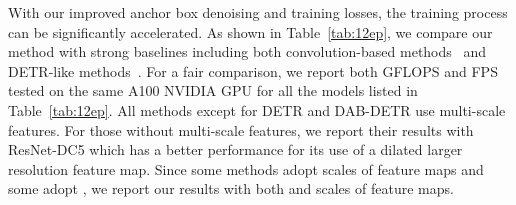 \documentclass[runningheads]{llncs}
\begin{document}
With our improved anchor box denoising and training losses, the training process can be significantly accelerated. As shown in Table~\ref{tab:12ep}, we compare our method with strong baselines including both convolution-based methods~\cite{ren2015faster,chen2019hybrid,dai2021dynamic} and DETR-like methods~\cite{carion2020end,zhu2020deformable,Dai_2021_ICCV,liu2022dab,li2022dn}. For a fair comparison, we report both GFLOPS and FPS tested on the same A100 NVIDIA GPU for all the models listed in Table~\ref{tab:12ep}. All methods except for DETR and DAB-DETR use multi-scale features. For those without multi-scale features, we report their results with ResNet-DC5 which has a better performance for its use of a dilated larger resolution feature map. Since some methods adopt  scales of feature maps and some adopt , we report our results with both  and  scales of feature maps. 
\end{document}
